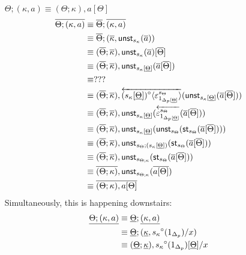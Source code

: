 \documentclass[10pt]{article}
\theoremstyle{definition}
\newcommand{\rewrite}[2]{\overleftarrow{#1}(#2)}
\newcommand\StI[2]{\ensuremath{\mathsf{st}_{#1}(#2)}}
\newcommand\UnSt[2]{\ensuremath{\mathsf{unst}_{#1}(#2)}}
\newcommand\TrCirc[2]{\ensuremath{{#1}^\circ(#2)}}
\newcommand\ap[2]{\ensuremath{#1 \langle #2 \rangle }}
\begin{document}
\begin{enumerate}[style = multiline, labelwidth = 80pt]
\item[{$\Theta ; (\kappa , a) \equiv (\Theta ; \kappa) , a[\Theta]$}] 
\begin{align*}
\upstairs{\Theta ; (\kappa , a) }
&\equiv \upstairs{\Theta} ; \upstairs{(\kappa , a)} \\
&\equiv \upstairs{\Theta} ; (\upstairs{\kappa}, \UnSt{s_{\kappa}}{\upstairs{a}}) \\
&\equiv (\upstairs{\Theta} ; \upstairs{\kappa}) , \UnSt{s_{\kappa}}{\upstairs{a}}[\upstairs{\Theta}] \\
&\equiv (\upstairs{\Theta} ; \upstairs{\kappa}) , \UnSt{s_{\kappa}[\downstairs{\Theta}]}{\upstairs{a}[\upstairs{\Theta}]} \\
&\equiv ??? \\
&\equiv (\upstairs{\Theta} ; \upstairs{\kappa}) , \rewrite{\ap{(s_\kappa[\downstairs{\Theta}])^\circ}{\varepsilon^{s_\Theta}_{1_{\asdep{\Delta}[\downstairs{\Theta}]}}}}{\UnSt{s_{\kappa}[\downstairs{\Theta}]}{\upstairs{a}[\upstairs{\Theta}]}} \\
&\equiv (\upstairs{\Theta} ; \upstairs{\kappa}) , \UnSt{s_{\kappa}[\downstairs{\Theta}]}{\rewrite{\varepsilon^{s_\Theta}_{1_{\asdep{\Delta}[\downstairs{\Theta}]}}}{\upstairs{a}[\upstairs{\Theta}]}} \\
&\equiv (\upstairs{\Theta} ; \upstairs{\kappa}) , \UnSt{s_{\kappa}[\downstairs{\Theta}]}{\UnSt{s_\Theta}{\StI{s_{\Theta}}{\upstairs{a}[\upstairs{\Theta}]}}} \\
&\equiv (\upstairs{\Theta} ; \upstairs{\kappa}) , \UnSt{s_\Theta ; (s_{\kappa}[\downstairs{\Theta}])}{\StI{s_{\Theta}}{\upstairs{a}[\upstairs{\Theta}]}} \\
&\equiv (\upstairs{\Theta} ; \upstairs{\kappa}) , \UnSt{s_{\Theta;\kappa}}{\StI{s_{\Theta}}{\upstairs{a}[\upstairs{\Theta}]}} \\
&\equiv \upstairs{(\Theta ; \kappa)} , \UnSt{s_{\Theta;\kappa}}{\upstairs{a[\Theta]}} \\
&\equiv \upstairs{(\Theta ; \kappa) , a[\Theta]} 
\end{align*}
Simultaneously, this is happening downstairs:
\begin{align*}
\downstairs{\Theta ; (\kappa , a) }
&\equiv \downstairs{\Theta} ; \downstairs{(\kappa , a)} \\
&\equiv \downstairs{\Theta} ; (\downstairs{\kappa} , \TrCirc{s_{\kappa}}{1_{\asdep{\Delta}}}/x) \\
&\equiv (\downstairs{\Theta} ; \downstairs{\kappa}) , \TrCirc{s_{\kappa}}{1_{\asdep{\Delta}}}[\downstairs{\Theta}]/x \\

\end{align*}
\end{enumerate}
\end{document}
